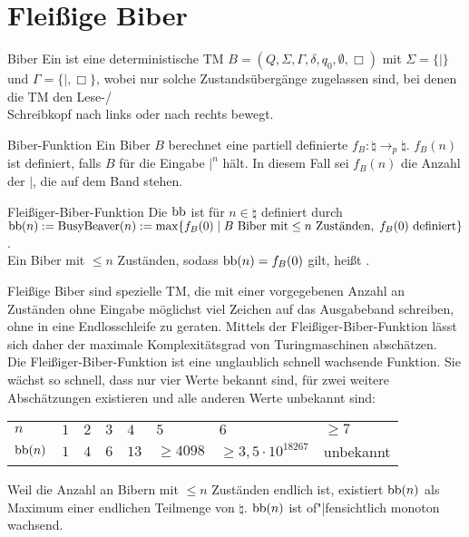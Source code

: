 \pagebreak

\section{%
    Fleißige Biber%
}

\begin{Def}{Biber}
    Ein  ist eine deterministische TM
    $B = (Q, \Sigma, \Gamma, \delta, q_0, \emptyset, \Box)$ mit
    $\Sigma = \{|\}$ und $\Gamma = \{|, \Box\}$, wobei nur solche Zustandsübergänge zugelassen
    sind, bei denen die TM den Lese-/\\Schreibkopf nach links oder nach rechts bewegt.
\end{Def}

\begin{Def}{Biber-Funktion}
    Ein Biber $B$ berechnet eine partiell definierte 
    $f_B\colon \natural \rightarrow_p \natural$.
    $f_B(n)$ ist definiert, falls $B$ für die Eingabe $|^n$ hält.
    In diesem Fall sei $f_B(n)$ die Anzahl der $|$, die auf dem Band stehen.
\end{Def}

\begin{Def}{Fleißiger-Biber-Funktion}
    Die  $\text{bb}$ ist für $n \in \natural$ definiert durch
    $\text{bb}(n) := \text{BusyBeaver}(n) :=
    \max\{f_B(0) \;|\; B \text{ Biber mit} \le n \text{ Zuständen},\;
    f_B(0) \text{ definiert}\}$.\\
    Ein Biber mit $\le n$ Zuständen, sodass $\text{bb}(n) = f_B(0)$ gilt, heißt
    .
\end{Def}

\begin{Bem}
    Fleißige Biber sind spezielle TM, die mit einer vorgegebenen Anzahl an Zuständen ohne
    Eingabe möglichst viel Zeichen auf das Ausgabeband schreiben, ohne in eine Endlosschleife
    zu geraten.
    Mittels der Fleißiger-Biber-Funktion lässt sich daher der maximale Komplexitätsgrad von
    Turingmaschinen abschätzen.\\
    Die Fleißiger-Biber-Funktion ist eine unglaublich schnell wachsende Funktion.
    Sie wächst so schnell, dass nur vier Werte bekannt sind, für zwei weitere Abschätzungen
    existieren und alle anderen Werte unbekannt sind:

    \begin{tabular}{p{15mm}p{5mm}p{5mm}p{5mm}p{5mm}p{15mm}p{25mm}p{20mm}}
        \toprule
        \textbf{$n$} &
        $1$ & $2$ & $3$ & $4$ & $5$ & $6$ & $\ge 7$\\

        \textbf{$\text{bb}(n)$} &
        $1$ & $4$ & $6$ & $13$ & $\ge 4098$ & $\ge 3{,}5 \cdot 10^{18267}$ & unbekannt\\
        \bottomrule
    \end{tabular}

    Weil die Anzahl an Bibern mit $\le n$ Zuständen endlich ist, existiert $\text{bb}(n)$ als
    Maximum einer endlichen Teilmenge von $\natural$.
    $\text{bb}(n)$ ist of"|fensichtlich monoton wachsend.
\end{Bem}

